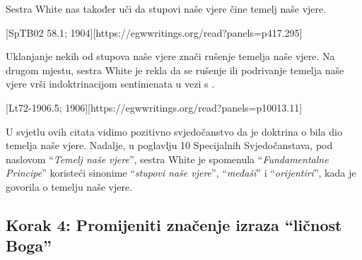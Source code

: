 Sestra White nas također uči da stupovi naše vjere čine temelj naše vjere.

[SpTB02 58.1; 1904][https://egwwritings.org/read?panels=p417.295]

Uklanjanje nekih od stupova naše vjere znači rušenje temelja naše vjere. Na drugom mjestu, sestra White je rekla da se rušenje ili podrivanje temelja naše vjere vrši indoktrinacijom sentimenata u vezi s .

[Lt72-1906.5; 1906][https://egwwritings.org/read?panels=p10013.11]

U svjetlu ovih citata vidimo pozitivno svjedočanstvo da je doktrina o  bila dio temelja naše vjere. Nadalje, u poglavlju 10 Specijalnih Svjedočanstava, pod naslovom “\textit{Temelj naše vjere}”, sestra White je spomenula “\textit{Fundamentalne Principe}” koristeći sinonime “\textit{stupovi naše vjere}”, “\textit{međaši}” i “\textit{orijentiri}”, kada je govorila o temelju naše vjere.

\subsection*{Korak 4: Promijeniti značenje izraza “ličnost Boga”}

